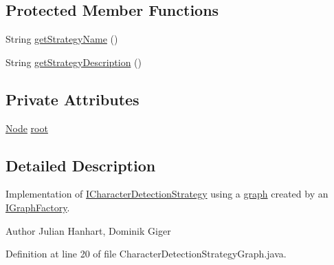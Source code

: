 \subsection*{Protected Member Functions}
\begin{DoxyCompactItemize}
\item 
String \hyperlink{classch_1_1zhaw_1_1ba10__bsha__1_1_1strategies_1_1CharacterDetectionStrategyGraph_a3d897fb9be39b36575cf7d4630580445}{getStrategyName} ()
\item 
String \hyperlink{classch_1_1zhaw_1_1ba10__bsha__1_1_1strategies_1_1CharacterDetectionStrategyGraph_a29a9028d4b5f045527297dc35f4155de}{getStrategyDescription} ()
\end{DoxyCompactItemize}
\subsection*{Private Attributes}
\begin{DoxyCompactItemize}
\item 
\hyperlink{classch_1_1zhaw_1_1ba10__bsha__1_1_1graph_1_1Node}{Node} \hyperlink{classch_1_1zhaw_1_1ba10__bsha__1_1_1strategies_1_1CharacterDetectionStrategyGraph_a8c963ad3d95559024da1e8f790e4710b}{root}
\end{DoxyCompactItemize}


\subsection{Detailed Description}
Implementation of \hyperlink{interfacech_1_1zhaw_1_1ba10__bsha__1_1_1strategies_1_1ICharacterDetectionStrategy}{ICharacterDetectionStrategy} using a \hyperlink{namespacech_1_1zhaw_1_1ba10__bsha__1_1_1graph}{graph} created by an \hyperlink{}{IGraphFactory}.

\begin{DoxyAuthor}{Author}
Julian Hanhart, Dominik Giger 
\end{DoxyAuthor}


Definition at line 20 of file CharacterDetectionStrategyGraph.java.


